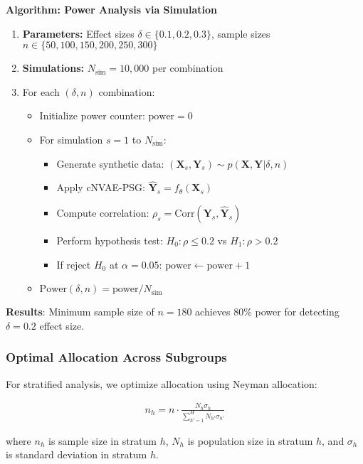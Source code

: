 \documentclass[11pt]{article}
\begin{document}
\textbf{Algorithm: Power Analysis via Simulation}

\begin{enumerate}
\item \textbf{Parameters:} Effect sizes $\delta \in \{0.1, 0.2, 0.3\}$, sample sizes $n \in \{50, 100, 150, 200, 250, 300\}$
\item \textbf{Simulations:} $N_{\text{sim}} = 10,000$ per combination
\item For each $(\delta, n)$ combination:
    \begin{itemize}
    \item Initialize power counter: $\text{power} = 0$
    \item For simulation $s = 1$ to $N_{\text{sim}}$:
        \begin{itemize}
        \item Generate synthetic data: $(\mathbf{X}_s, \mathbf{Y}_s) \sim p(\mathbf{X}, \mathbf{Y} | \delta, n)$
        \item Apply cNVAE-PSG: $\hat{\mathbf{Y}}_s = f_\theta(\mathbf{X}_s)$
        \item Compute correlation: $\rho_s = \text{Corr}(\mathbf{Y}_s, \hat{\mathbf{Y}}_s)$
        \item Perform hypothesis test: $H_0: \rho \leq 0.2$ vs $H_1: \rho > 0.2$
        \item If reject $H_0$ at $\alpha = 0.05$: $\text{power} \leftarrow \text{power} + 1$
        \end{itemize}
    \item $\text{Power}(\delta, n) = \text{power} / N_{\text{sim}}$
    \end{itemize}
\end{enumerate}

\textbf{Results}: Minimum sample size of $n = 180$ achieves 80\% power for detecting $\delta = 0.2$ effect size.

\subsubsection{Optimal Allocation Across Subgroups}
For stratified analysis, we optimize allocation using Neyman allocation:

\begin{align}
n_h = n \cdot \frac{N_h \sigma_h}{\sum_{h'=1}^H N_{h'} \sigma_{h'}}
\end{align}

where $n_h$ is sample size in stratum $h$, $N_h$ is population size in stratum $h$, and $\sigma_h$ is standard deviation in stratum $h$.
\end{document}
